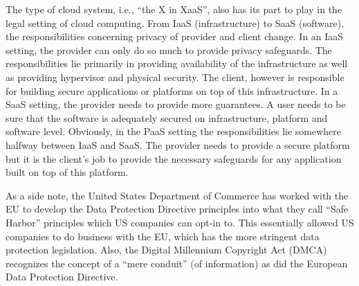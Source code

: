 \documentclass[11pt]{article}
\begin{document}
The type of cloud system, i.e., ``the X in XaaS'', also has its part to play in the legal setting of cloud computing.
From IaaS (infrastructure) to SaaS (software), the responsibilities concerning privacy of provider and client change.
In an IaaS setting, the provider can only do so much to provide privacy safeguards.
The responsibilities lie primarily in providing availability of the infrastructure as well as providing hypervisor and physical security.
The client, however is responsible for building secure applications or platforms on top of this infrastructure.
In a SaaS setting, the provider needs to provide more guarantees.
A user needs to be sure that the software is adequately secured on infrastructure, platform and software level.
Obviously, in the PaaS setting the responsibilities lie somewhere halfway between IaaS and SaaS. The provider needs to provide a secure platform but it is the client's job to provide the necessary safeguards for any application built on top of this platform.


As a side note, the United States Department of Commerce has worked with the EU to develop the Data Protection Directive principles into what they call ``Safe Harbor'' principles which US companies can opt-in to.
This essentially allowed US companies to do business with the EU, which has the more stringent data protection legislation.
Also, the Digital Millennium Copyright Act (DMCA) recognizes the concept of a ``mere conduit'' (of information) as did the European Data Protection Directive. \cite{congress1998digital}





\end{document}
